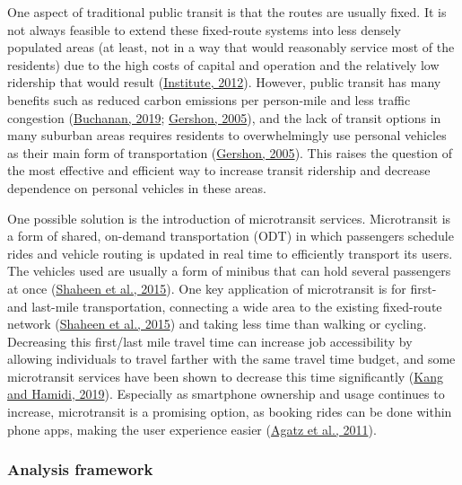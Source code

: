 \documentclass[
]{article}
\begin{document}
One aspect of traditional public transit is that the routes are usually fixed. It is not always feasible to extend these fixed-route systems into less densely populated areas (at least, not in a way that would reasonably service most of the residents) due to the high costs of capital and operation and the relatively low ridership that would result (\protect\hyperlink{ref-MinetaTransportationInstitute2012}{Institute, 2012}). However, public transit has many benefits such as reduced carbon emissions per person-mile and less traffic congestion (\protect\hyperlink{ref-Buchanan2019}{Buchanan, 2019}; \protect\hyperlink{ref-Gershon2005}{Gershon, 2005}), and the lack of transit options in many suburban areas requires residents to overwhelmingly use personal vehicles as their main form of transportation (\protect\hyperlink{ref-Gershon2005}{Gershon, 2005}). This raises the question of the most effective and efficient way to increase transit ridership and decrease dependence on personal vehicles in these areas.

One possible solution is the introduction of microtransit services. Microtransit is a form of shared, on-demand transportation (ODT) in which passengers schedule rides and vehicle routing is updated in real time to efficiently transport its users. The vehicles used are usually a form of minibus that can hold several passengers at once (\protect\hyperlink{ref-Shaheen2015}{Shaheen et al., 2015}). One key application of microtransit is for first- and last-mile transportation, connecting a wide area to the existing fixed-route network (\protect\hyperlink{ref-Shaheen2015}{Shaheen et al., 2015}) and taking less time than walking or cycling. Decreasing this first/last mile travel time can increase job accessibility by allowing individuals to travel farther with the same travel time budget, and some microtransit services have been shown to decrease this time significantly (\protect\hyperlink{ref-Kang2019}{Kang and Hamidi, 2019}). Especially as smartphone ownership and usage continues to increase, microtransit is a promising option, as booking rides can be done within phone apps, making the user experience easier (\protect\hyperlink{ref-Agatz2011}{Agatz et al., 2011}).

\hypertarget{analysis-framework}{%
\subsubsection{Analysis framework}\label{analysis-framework}}
\end{document}
